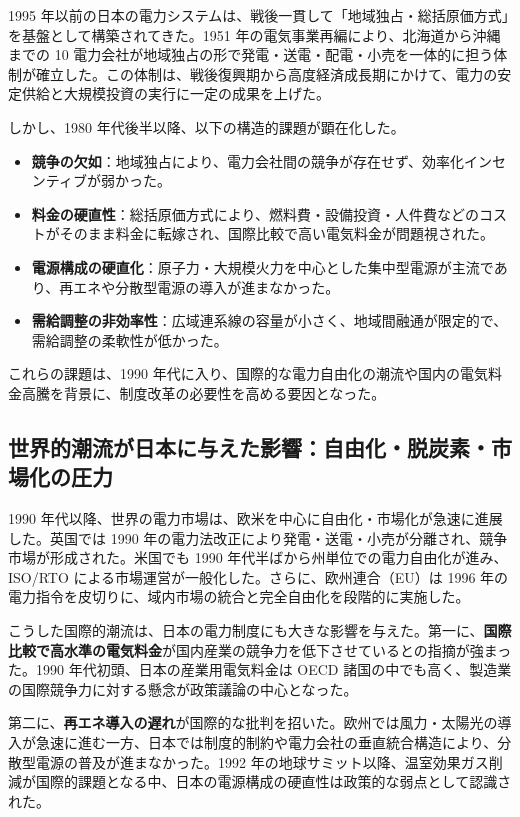 1995 年以前の日本の電力システムは、戦後一貫して「地域独占・総括原価方式」を基盤として構築されてきた。1951 年の電気事業再編により、北海道から沖縄までの 10 電力会社が地域独占の形で発電・送電・配電・小売を一体的に担う体制が確立した。この体制は、戦後復興期から高度経済成長期にかけて、電力の安定供給と大規模投資の実行に一定の成果を上げた。

しかし、1980 年代後半以降、以下の構造的課題が顕在化した。

\begin{itemize}
  \item \textbf{競争の欠如}：地域独占により、電力会社間の競争が存在せず、効率化インセンティブが弱かった。
  \item \textbf{料金の硬直性}：総括原価方式により、燃料費・設備投資・人件費などのコストがそのまま料金に転嫁され、国際比較で高い電気料金が問題視された。
  \item \textbf{電源構成の硬直化}：原子力・大規模火力を中心とした集中型電源が主流であり、再エネや分散型電源の導入が進まなかった。
  \item \textbf{需給調整の非効率性}：広域連系線の容量が小さく、地域間融通が限定的で、需給調整の柔軟性が低かった。
\end{itemize}

これらの課題は、1990 年代に入り、国際的な電力自由化の潮流や国内の電気料金高騰を背景に、制度改革の必要性を高める要因となった。

\subsection{世界的潮流が日本に与えた影響：自由化・脱炭素・市場化の圧力}

1990 年代以降、世界の電力市場は、欧米を中心に自由化・市場化が急速に進展した。英国では 1990 年の電力法改正により発電・送電・小売が分離され、競争市場が形成された。米国でも 1990 年代半ばから州単位での電力自由化が進み、ISO/RTO による市場運営が一般化した。さらに、欧州連合（EU）は 1996 年の電力指令を皮切りに、域内市場の統合と完全自由化を段階的に実施した\parencite{IEA2001Reform,EU1996Directive}。

こうした国際的潮流は、日本の電力制度にも大きな影響を与えた。第一に、\textbf{国際比較で高水準の電気料金}が国内産業の競争力を低下させているとの指摘が強まった。1990 年代初頭、日本の産業用電気料金は OECD 諸国の中でも高く、製造業の国際競争力に対する懸念が政策議論の中心となった\parencite{OECD1994EnergyPrice}。

第二に、\textbf{再エネ導入の遅れ}が国際的な批判を招いた。欧州では風力・太陽光の導入が急速に進む一方、日本では制度的制約や電力会社の垂直統合構造により、分散型電源の普及が進まなかった。1992 年の地球サミット以降、温室効果ガス削減が国際的課題となる中、日本の電源構成の硬直性は政策的な弱点として認識された。

